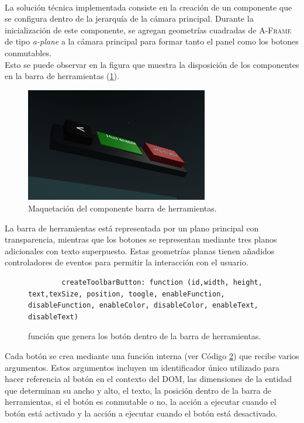 \documentclass[a4paper, 11pt]{book}
\begin{document}
\\La solución técnica implementada consiste en la creación de un componente que se configura dentro de la jerarquía de la cámara principal. Durante la inicialización de este componente, se agregan geometrías cuadradas de \textsc{A-Frame} de tipo \emph{a-plane} a la cámara principal para formar tanto el panel como los botones conmutables. \\
Esto se puede observar en la figura que muestra la disposición de los componentes en la barra de herramientas (\ref{fig:toolbarComposition}).
\begin{figure}[h]
	\centering
	\includegraphics[width=8cm, keepaspectratio]{img/toolbarElementos.jpg}
	\caption{Maquetación del componente barra de herramientas.}
	\label{fig:toolbarComposition}
\end{figure}
La barra de herramientas está representada por un plano principal con transparencia, mientras que los botones se representan mediante tres planos adicionales con texto superpuesto. Estas geometrías planas tienen añadidos controladores de eventos para permitir la interacción con el usuario.\\
\begin{figure}[h]
	\centering
	\begin{verbatim}
		createToolbarButton: function (id,width, height, text,texSize, position, toogle, enableFunction, disableFunction, enableColor, disableColor, enableText, disableText)
	\end{verbatim}
	\caption{función que genera los botón dentro de la barra de herramientas.
		\label{codigo:crearBoton}
	}
\end{figure}
Cada botón se crea mediante una función interna (ver Código \ref{codigo:crearBoton}) que recibe varios argumentos. Estos argumentos incluyen un identificador único utilizado para hacer referencia al botón en el contexto del \textsc{DOM}, las dimensiones de la entidad que determinan su ancho y alto, el texto, la posición dentro de la barra de herramientas, si el botón es conmutable o no, la acción a ejecutar cuando el botón está activado y la acción a ejecutar cuando el botón está desactivado.\\
\end{document}
